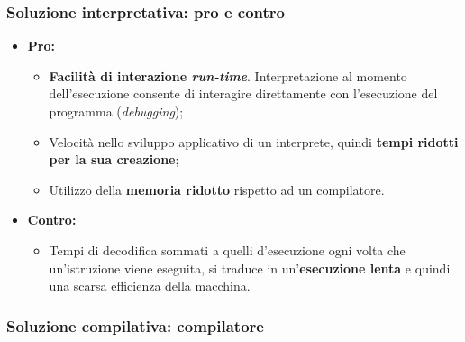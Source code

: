 \documentclass[a4paper]{article}
\begin{document}
	\subsubsection{Soluzione interpretativa: pro e contro}
	
	\begin{itemize}
		\item \textcolor{Green4}{\textbf{Pro:}}
		\begin{itemize}
			\item \textbf{Facilità di interazione \emph{run-time}}. Interpretazione al momento dell'esecuzione consente di interagire direttamente con l'esecuzione del programma (\emph{debugging});
			\item Velocità nello sviluppo applicativo di un interprete, quindi \textbf{tempi ridotti per la sua creazione};
			\item Utilizzo della \textbf{memoria ridotto} rispetto ad un compilatore.
		\end{itemize}

		\item \textcolor{Red3}{\textbf{Contro:}}
		\begin{itemize}
			\item Tempi di decodifica sommati a quelli d'esecuzione ogni volta che un'istruzione viene eseguita, si traduce in un'\textbf{esecuzione lenta} e quindi una scarsa efficienza della macchina.
		\end{itemize}
	\end{itemize}\newpage
	
	\subsubsection{Soluzione compilativa: compilatore}\label{compilatore}
\end{document}
